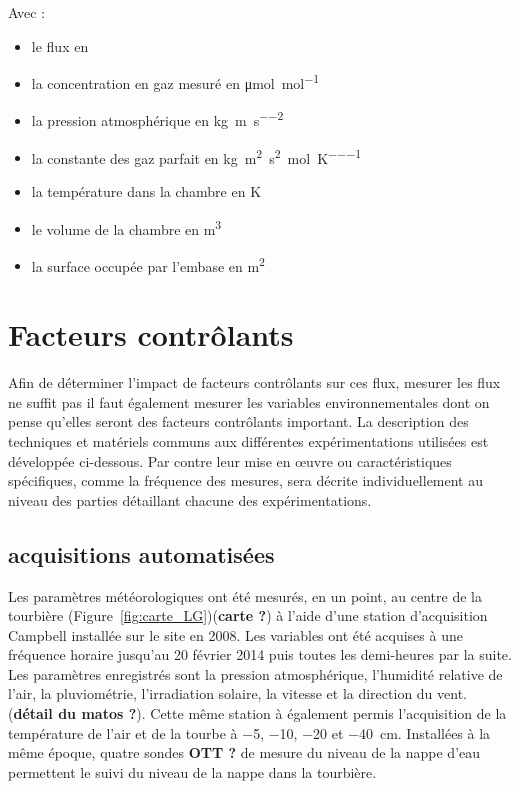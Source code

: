 Avec : 
\begin{itemize}
\item[F :] le flux en \si{\uml}
\item[X :] la concentration en gaz mesuré en \si{\micro\mole\per\mole}
\item[P :] la pression atmosphérique en \si{\kilo\gram\per\metre\per\square\second}
\item[R :] la constante des gaz parfait en \si{\kilo\gram\square\metre\per\square\second\per\mole\per\kelvin}
\item[T :] la température dans la chambre en \si{\kelvin}
\item[V :] le volume de la chambre en \si{\cubic\metre}
\item[S :] la surface occupée par l'embase en \si{\square\metre}
\end{itemize}

%
%


\section{Facteurs contrôlants}
Afin de déterminer l'impact de facteurs contrôlants sur ces flux, mesurer les flux ne suffit pas il faut également mesurer les variables environnementales dont on pense qu'elles seront des facteurs contrôlants important.
La description des techniques et matériels communs aux différentes expérimentations utilisées est développée ci-dessous.
Par contre leur mise en œuvre ou caractéristiques spécifiques, comme la fréquence des mesures, sera décrite individuellement au niveau des parties détaillant chacune des expérimentations.

\subsection{acquisitions automatisées}

Les paramètres météorologiques ont été mesurés, en un point, au centre de la tourbière (Figure~\ref{fig:carte_LG})(\textbf{carte ?}) à l'aide d'une station d'acquisition Campbell installée sur le site en 2008.
Les variables ont été acquises à une fréquence horaire jusqu'au 20 février 2014 puis toutes les demi-heures par la suite. 
Les paramètres enregistrés sont la pression atmosphérique, l'humidité relative de l'air, la pluviométrie, l'irradiation solaire, la vitesse et la direction du vent. (\textbf{détail du matos ?}).
Cette même station à également permis l'acquisition de la température de l'air et de la tourbe à \num{-5}, \num{-10}, \num{-20} et \SIlist{-40}{\cm}.
Installées à la même époque, quatre sondes \textbf{OTT ?} de mesure du niveau de la nappe d'eau permettent le suivi du niveau de la nappe dans la tourbière.


